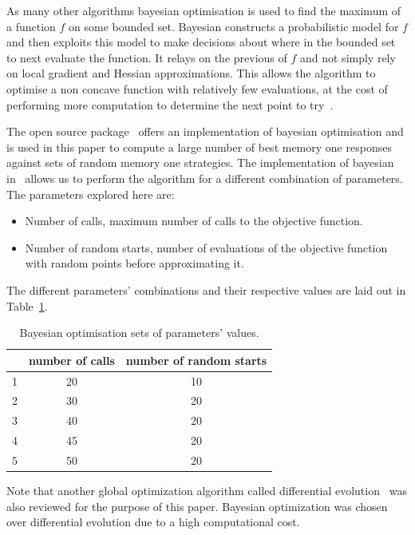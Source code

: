 \documentclass[10pt]{article}
\begin{document}
As many other algorithms bayesian optimisation is used to find the maximum of a
function \(f\) on some bounded set. Bayesian constructs a probabilistic
model for \(f\) and then exploits this model to make decisions about where in the
bounded set to next evaluate the function. It relays on the previous
of \(f\) and not simply rely on local gradient and Hessian approximations.
This allows the algorithm to optimise a non concave function with relatively few
evaluations, at the cost of performing more computation to determine the next point
to try~\cite{snoek2012}.

The open source package~\cite{Head2018} offers an implementation of bayesian optimisation
and is used in this paper to compute a large number of best memory one responses against
sets of random memory one strategies. The implementation of bayesian in~\cite{Head2018}
allows us to perform the algorithm for a different combination of parameters.
The parameters explored here are:

\begin{itemize}
    \item Number of calls, maximum number of calls to the objective function.
    \item Number of random starts, number of evaluations of the objective function
    with random points before approximating it.
\end{itemize}

The different parameters' combinations and their respective values are laid out in
Table~\ref{table:ba_opt}.

\begin{table}[htbp]
\begin{center}
\begin{tabular}{ccc}
    \toprule
    {} &  number of calls & number of random starts\\
    \midrule
    1 & 20 & 10 \\
    2 & 30 & 20 \\
    3 & 40 & 20 \\
    4 & 45 & 20 \\
    5 & 50 & 20 \\
    \bottomrule
\end{tabular}
\end{center}
\caption{Bayesian optimisation sets of parameters' values.}
\label{table:ba_opt}
\end{table}

Note that another global optimization algorithm called differential evolution~\cite{Storn1997}
was also reviewed for the purpose of this paper. Bayesian optimization was
chosen over differential evolution due to a high computational cost.
\end{document}
